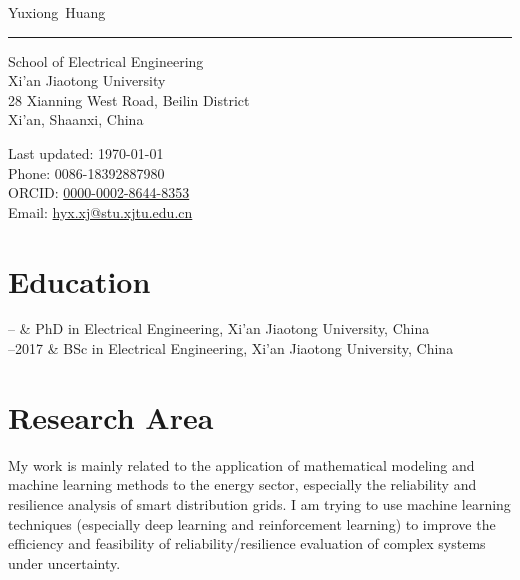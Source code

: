 \documentclass[11pt, a4paper]{article}
\makeatletter
\newcommand{\XJTUEE}{School of Electrical Engineering}
\newcommand{\XJTU}{Xi'an Jiaotong University}
\newcommand{\FirstName}{Yuxiong}
\newcommand{\LastName}{Huang}
\newcommand{\MyName}{\FirstName\ \LastName}
\newcommand{\Email}{hyx.xj@stu.xjtu.edu.cn}
\newcommand{\Phone}{0086-18392887980}
\newcommand{\ORCID}{0000-0002-8644-8353}
\newcommand{\Affiliation}{\XJTUEE \\ \XJTU}
\newcommand{\Address}{
  28 Xianning West Road, Beilin District \\ Xi'an, Shaanxi, China
}
\newcommand{\Duration}[2]{\fontsize{10pt}{0}\selectfont #1--#2}
\makeatother
\begin{document}
\thispagestyle{empty}

{\fontsize{24pt}{0}\selectfont\MyName}\\[-0.1cm]
\rule{\textwidth}{0.2pt}
\begin{minipage}[t]{0.595\textwidth}
  \Affiliation
  \\
  \Address
\end{minipage}
\begin{minipage}[t]{0.405\textwidth}
  \begin{flushright}
  Last updated: \monthyear\today
  \\
    Phone: \Phone
    \\
    ORCID: \href{https://orcid.org/\ORCID}{\ORCID}
    \\
    Email: \href{mailto:\Email}{\Email}
    
  \end{flushright}
\end{minipage}


\section{Education}

\begin{EntriesTable}
  \Duration{2017}{}  &
  PhD in Electrical Engineering, \XJTU, China
  \\
  \Duration{2013}{2017}  &
  BSc in Electrical Engineering, \XJTU, China
\end{EntriesTable}


\section{Research Area}
My work is mainly related to the application of mathematical modeling and machine learning methods to the energy sector, especially the reliability and resilience analysis of smart distribution grids. I am trying to use machine learning techniques (especially deep learning and reinforcement learning) to improve the efficiency and feasibility of reliability/resilience evaluation of complex systems under uncertainty. 


\end{document}
